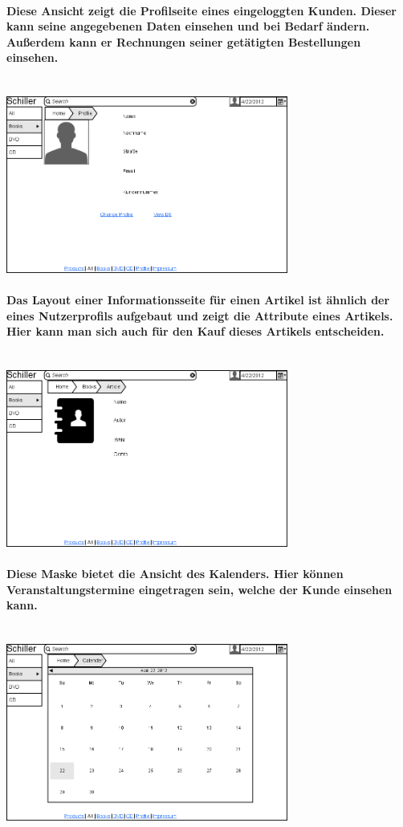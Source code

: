 \documentclass[a4paper]{article}
\begin{document}
\paragraph{Diese Ansicht zeigt die Profilseite eines eingeloggten Kunden. Dieser kann seine angegebenen Daten einsehen und bei Bedarf ändern. Außerdem kann er Rechnungen seiner getätigten Bestellungen einsehen.\\ \\}
\includegraphics[width=350px]{4ProfileView.png}

\paragraph{Das Layout einer Informationsseite für einen Artikel ist ähnlich der eines Nutzerprofils aufgebaut und zeigt die Attribute eines Artikels. Hier kann man sich auch für den Kauf dieses Artikels entscheiden.\\ \\}
\includegraphics[width=350px]{5ArticleView.png}

\paragraph{Diese Maske bietet die Ansicht des Kalenders. Hier können Veranstaltungstermine eingetragen sein, welche der Kunde einsehen kann.\\ \\}
\includegraphics[width=350px]{6CalenderView.png}
\end{document}

